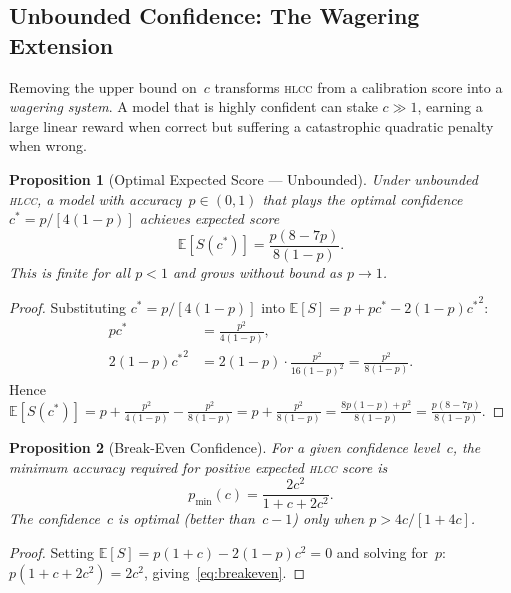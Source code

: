 \documentclass[11pt,a4paper]{article}
\newtheorem{proposition}{Proposition}
\newcommand{\hlcc}{\textsc{hlcc}}
\newcommand{\E}{\mathbb{E}}
\newcommand{\cstar}{c^{*}}
\begin{document}
\subsection{Unbounded Confidence: The Wagering Extension}
\label{sec:unbounded}

Removing the upper bound on~$c$ transforms \hlcc{} from a calibration
score into a \emph{wagering system}.  A model that is highly confident
can stake $c \gg 1$, earning a large linear reward when correct but
suffering a catastrophic quadratic penalty when wrong.

\begin{proposition}[Optimal Expected Score --- Unbounded]
\label{prop:unbounded-score}
  Under unbounded \hlcc{}, a model with accuracy~$p \in (0,1)$ that
  plays the optimal confidence $\cstar = p/[4(1{-}p)]$ achieves
  expected score
  \begin{equation}
    \E[S(\cstar)] = \frac{p(8 - 7p)}{8(1-p)}.
    \label{eq:unbounded-expected}
  \end{equation}
  This is finite for all $p < 1$ and grows without bound as
  $p \to 1$.
\end{proposition}

\begin{proof}
  Substituting $\cstar = p/[4(1{-}p)]$ into
  $\E[S] = p + p\cstar - 2(1{-}p){\cstar}^{2}$:
  \begin{align}
    p\cstar &= \frac{p^{2}}{4(1-p)}, \\
    2(1{-}p){\cstar}^{2} &= 2(1{-}p)\cdot\frac{p^{2}}{16(1{-}p)^{2}}
      = \frac{p^{2}}{8(1-p)}.
  \end{align}
  Hence $\E[S(\cstar)] = p + \frac{p^{2}}{4(1{-}p)} -
  \frac{p^{2}}{8(1{-}p)} = p + \frac{p^{2}}{8(1{-}p)} =
  \frac{8p(1{-}p) + p^{2}}{8(1{-}p)} = \frac{p(8-7p)}{8(1{-}p)}$.
\end{proof}

\begin{proposition}[Break-Even Confidence]
\label{prop:breakeven}
  For a given confidence level~$c$, the minimum accuracy required for
  positive expected \hlcc{} score is
  \begin{equation}
    p_{\min}(c) = \frac{2c^{2}}{1 + c + 2c^{2}}.
    \label{eq:breakeven}
  \end{equation}
  The confidence~$c$ is optimal (better than~$c{-}1$) only when
  $p > 4c/[1 + 4c]$.
\end{proposition}

\begin{proof}
  Setting $\E[S] = p(1{+}c) - 2(1{-}p)c^{2} = 0$ and solving for~$p$:
  $p(1{+}c{+}2c^{2}) = 2c^{2}$, giving~\eqref{eq:breakeven}.
\end{proof}
\end{document}
